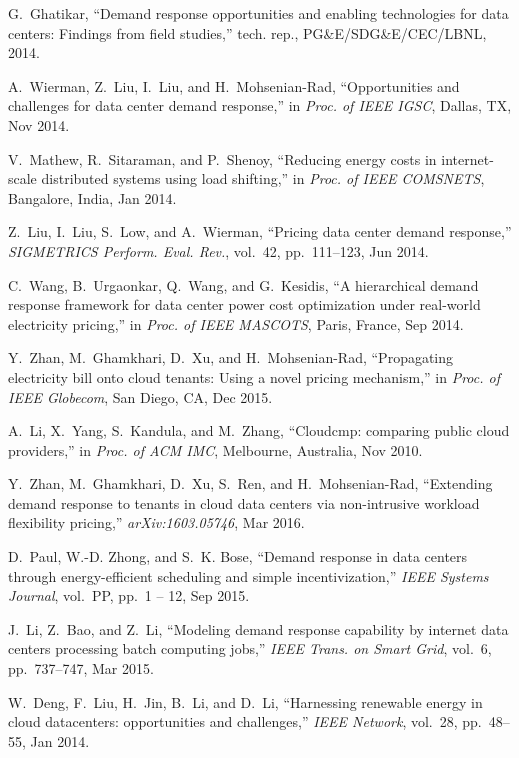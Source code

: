 \documentclass[conference]{IEEEtran}
\begin{document}
\begin{thebibliography}{10}

G.~Ghatikar, ``Demand response opportunities and enabling technologies for data
  centers: Findings from field studies,'' tech. rep., PG\&E/SDG\&E/CEC/LBNL,
  2014.

A.~Wierman, Z.~Liu, I.~Liu, and H.~Mohsenian-Rad, ``Opportunities and
  challenges for data center demand response,'' in {\em Proc. of IEEE IGSC},
 Dallas, TX, Nov 2014.

V.~Mathew, R.~Sitaraman, and P.~Shenoy, ``Reducing energy costs in
  internet-scale distributed systems using load shifting,'' in {\em Proc. of
  IEEE COMSNETS}, Bangalore, India, Jan 2014.

Z.~Liu, I.~Liu, S.~Low, and A.~Wierman, ``Pricing data center demand
  response,'' {\em SIGMETRICS Perform. Eval. Rev.}, vol.~42, pp.~111--123, Jun
  2014.

C.~Wang, B.~Urgaonkar, Q.~Wang, and G.~Kesidis, ``A hierarchical demand
  response framework for data center power cost optimization under real-world
  electricity pricing,'' in {\em Proc. of IEEE MASCOTS},  Paris,
  France, Sep 2014.

Y.~Zhan, M.~Ghamkhari, D.~Xu, and H.~Mohsenian-Rad, ``Propagating electricity
  bill onto cloud tenants: Using a novel pricing mechanism,'' in {\em Proc. of
  IEEE Globecom},  San Diego, CA, Dec 2015.

A.~Li, X.~Yang, S.~Kandula, and M.~Zhang, ``Cloudcmp: comparing public cloud
  providers,'' in {\em Proc. of ACM IMC}, Melbourne, Australia, Nov
  2010.

Y.~Zhan, M.~Ghamkhari, D.~Xu, S.~Ren, and H.~Mohsenian-Rad, ``Extending demand
  response to tenants in cloud data centers via non-intrusive workload
  flexibility pricing,'' {\em arXiv:1603.05746}, Mar 2016.

D.~Paul, W.-D. Zhong, and S.~K. Bose, ``Demand response in data centers through
  energy-efficient scheduling and simple incentivization,'' {\em IEEE Systems
  Journal}, vol.~PP, pp.~1 -- 12, Sep 2015.

J.~Li, Z.~Bao, and Z.~Li, ``Modeling demand response capability by internet
  data centers processing batch computing jobs,'' {\em IEEE Trans. on Smart
  Grid}, vol.~6, pp.~737--747, Mar 2015.

W.~Deng, F.~Liu, H.~Jin, B.~Li, and D.~Li, ``Harnessing renewable energy in
  cloud datacenters: opportunities and challenges,'' {\em IEEE Network},
  vol.~28, pp.~48--55, Jan 2014.


\end{thebibliography}
\end{document}
